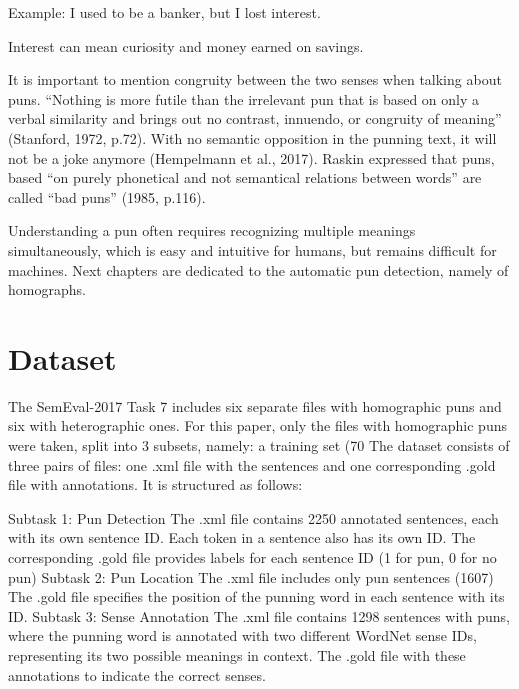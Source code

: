 \documentclass[10pt]{article}
\begin{document}
Example: I used to be a banker, but I lost interest.

Interest can mean curiosity and money earned on savings.

It is important to mention congruity between the two senses when talking about puns. “Nothing is more futile than the irrelevant pun that is based on only a verbal similarity and brings out no contrast, innuendo, or congruity of meaning” (Stanford, 1972, p.72). With no semantic opposition in the punning text, it will not be a joke anymore (Hempelmann et al., 2017). Raskin expressed that puns, based “on purely phonetical and not semantical relations between words” are called “bad puns” (1985, p.116). 

Understanding a pun often requires recognizing multiple meanings simultaneously, which is easy and intuitive for humans, but remains difficult for machines. Next chapters are dedicated to the automatic pun detection, namely of homographs. 

\section{Dataset}
The SemEval-2017 Task 7 includes six separate files with homographic puns and six with heterographic ones. For this paper, only the files with homographic puns were taken, split into 3 subsets, namely: a training set (70%
The dataset consists of three pairs of files: one .xml file with the sentences and one corresponding .gold file with annotations.
It is structured as follows:

Subtask 1: Pun Detection
The .xml file contains 2250 annotated sentences, each with its own sentence ID.
Each token in a sentence also has its own ID.
The corresponding .gold file provides labels for each sentence ID (1 for pun, 0 for no pun)
Subtask 2: Pun Location
The .xml file includes only pun sentences (1607)
The .gold file specifies the position of the punning word in each sentence with its ID.
Subtask 3: Sense Annotation
The .xml file contains 1298 sentences with puns, where the punning word is annotated with two different WordNet sense IDs, representing its two possible meanings in context.
The .gold file with these annotations to indicate the correct senses.
\end{document}
